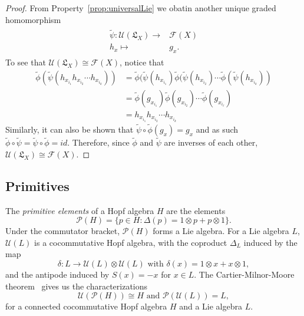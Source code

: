 \documentclass[11pt]{amsart}
\theoremstyle{definition}
\numberwithin{equation}{section}
\begin{document}
\begin{proof}
    From Property~\ref{prop:universalLie} we obatin another unique graded homomorphism 
    \begin{align*}
        \begin{array}{rcl}
            \tilde{\psi}: \mathcal{U}(\mathfrak{L}_{X}) \longrightarrow & \mathcal{F} (X) \\
            h_x \longmapsto & g_x.
        \end{array}
    \end{align*}
    To see that \(\mathcal{U}(\mathfrak{L}_{X}) \cong \mathcal{F}(X)\), notice that
    \begin{align*}
        \tilde{\phi}(\tilde{\psi}(h_{x_{i_{1}} }h_{x_{i_{2}}} \cdots h_{x_{i_{k}}}))  
        &= \tilde{\phi}(\tilde{\psi}(h_{x_{i_{1}} })\tilde{\phi}(\tilde{\psi}(h_{x_{i_{2}} } )\cdots \tilde{\phi}(\tilde{\psi}(h_{x_{i_{k}} })) \\
        &=  \tilde{\phi}(g_{x_{i_{1}} })\tilde{\phi}(g_{x_{i_{2}} })\cdots \tilde{\phi}(g_{x_{i_{\ell}} })\\
        &= h_{x_{i_{1}} }h_{x_{i_{2}} } \cdots h_{x_{i_{k}} }
    \end{align*} 
    Similarly, it can also be shown that \(\tilde{\psi} \circ \tilde{\phi} (g_x) = g_x\) and as such \(\tilde{\phi} \circ \tilde{\psi} = \tilde{\psi} \circ \tilde{\phi} = id\).
    Therefore, since \(\tilde{\phi}\) and \(\tilde{\psi}\) are inverses of each other,  \(\mathcal{U}(\mathfrak{L}_{X}) \cong \mathcal{F}(X)\).
\end{proof}

%

\subsection{Primitives}

The \textit{primitive elements} of a Hopf algebra $H$ are the elements 
\[
\mathcal{P}(H)=\{p\in H:\Delta (p)=1\otimes p + p\otimes 1\}.
\]
Under the commutator bracket, $\mathcal{P}(H)$ forms a Lie algebra. For a Lie algebra $L$, $\mathcal{U}(L)$ is a cocommutative Hopf algebra, with the coproduct $\Delta_L$ induced by the map
\[
\delta :L\to \mathcal{U}(L)\otimes\mathcal{U}(L) \text{  with  }\delta(x)=1\otimes x + x\otimes 1,
\] 
and the antipode induced by $S(x)=-x$ for $x\in L.$
The Cartier-Milnor-Moore theorem~\cite[see Theorem 5.18]{MM65} gives us the characterizations
\[
\mathcal{U}(\mathcal{P}(H))\cong H \text{ and } \mathcal{P}(\mathcal{U}(L))=L,
\]
for a connected cocommutative Hopf algebra $H$ and a Lie algebra $L$.
\end{document}
